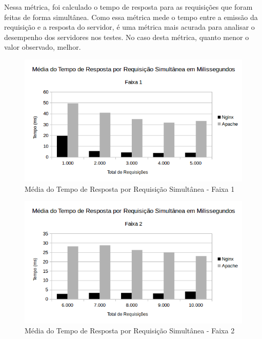 Nessa métrica, foi calculado o tempo de resposta para as requisições que foram 
feitas de forma simultânea. Como essa métrica mede o tempo entre a emissão da 
requisição e a resposta do servidor, é uma métrica mais acurada para analisar o 
desempenho dos servidores nos testes. No caso desta métrica, quanto menor o 
valor observado, melhor.

\begin{figure}[H]
	\centering
	\includegraphics[width=1\linewidth]{graficos/grafico5-f1} 
	\caption{Média do Tempo de Resposta por Requisição Simultânea - Faixa 1}
	\label{fig:grafico5-f1}
\end{figure}

\begin{figure}[H]
	\centering
	\includegraphics[width=1\linewidth]{graficos/grafico5-f2} 
	\caption{Média do Tempo de Resposta por Requisição Simultânea - Faixa 2}
	\label{fig:grafico5-f2}
\end{figure}

